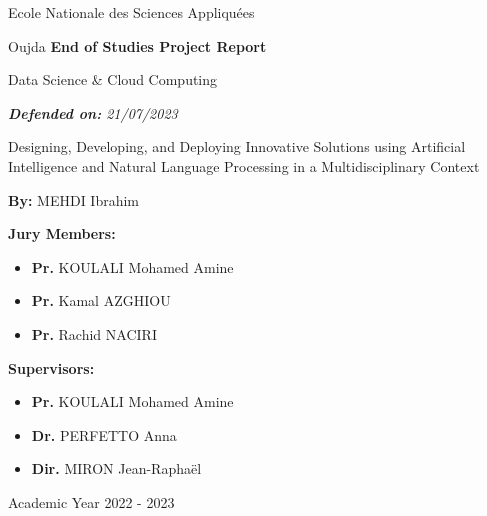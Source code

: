 \documentclass[a4paper,12pt,twoside]{report}
\begin{document}
\begin{titlepage}
\begin{center}
    \Large Ecole Nationale des Sciences Appliquées\par
    \Large Oujda\vfill
    \Large\textbf{End of Studies Project Report}\par
    \large Data Science \& Cloud Computing\par
    \textit{\textbf{Defended on:} 21/07/2023}\par
\end{center}



\begin{center}
    \hrulefill\par
    \LARGE Designing, Developing, and Deploying Innovative Solutions using Artificial Intelligence and Natural Language Processing in a Multidisciplinary Context\par
    \hrulefill\par
\end{center}
\vfill

\begin{center}
\textbf{By:}
    MEHDI Ibrahim

\end{center}

\vfill


\begin{multicols}{2}
\noindent \textbf{Jury Members:}
\begin{itemize}[label=\textbullet, leftmargin=*]
  \item \textbf{Pr.} KOULALI Mohamed Amine
    \item \textbf{Pr.} Kamal AZGHIOU
      \item \textbf{Pr.} Rachid NACIRI 
\end{itemize}

\columnbreak

\noindent \textbf{Supervisors:}
\begin{itemize}[label=\textbullet, leftmargin=*]
  \item \textbf{Pr.} KOULALI Mohamed Amine
  \item \textbf{Dr.} PERFETTO Anna
  \item \textbf{Dir.} MIRON Jean-Raphaël
\end{itemize}

\end{multicols}

\begin{center}
    Academic Year 2022 - 2023
\end{center}

\end{titlepage}
\end{document}
